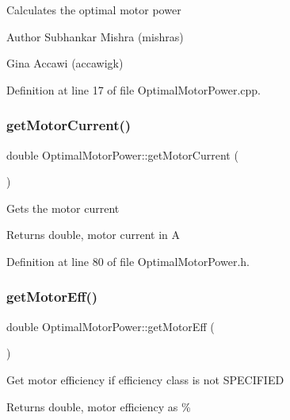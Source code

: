 Calculates the optimal motor power

\begin{DoxyAuthor}{Author}
Subhankar Mishra (mishras) 

Gina Accawi (accawigk) 
\end{DoxyAuthor}


Definition at line 17 of file Optimal\+Motor\+Power.\+cpp.

\mbox{\label{class_optimal_motor_power_a2c058c4320a840018a420e10272cc4dd}} 
\subsubsection{\texorpdfstring{get\+Motor\+Current()}{getMotorCurrent()}}
{\footnotesize\ttfamily double Optimal\+Motor\+Power\+::get\+Motor\+Current (\begin{DoxyParamCaption}{ }\end{DoxyParamCaption})\hspace{0.3cm}{\ttfamily [inline]}}

Gets the motor current \begin{DoxyReturn}{Returns}
double, motor current in A 
\end{DoxyReturn}


Definition at line 80 of file Optimal\+Motor\+Power.\+h.

\mbox{\label{class_optimal_motor_power_a341fe7520227f27f9cce23f3dc4cb0cb}} 
\subsubsection{\texorpdfstring{get\+Motor\+Eff()}{getMotorEff()}}
{\footnotesize\ttfamily double Optimal\+Motor\+Power\+::get\+Motor\+Eff (\begin{DoxyParamCaption}{ }\end{DoxyParamCaption})\hspace{0.3cm}{\ttfamily [inline]}}

Get motor efficiency if efficiency class is not S\+P\+E\+C\+I\+F\+I\+ED \begin{DoxyReturn}{Returns}
double, motor efficiency as \% 
\end{DoxyReturn}


